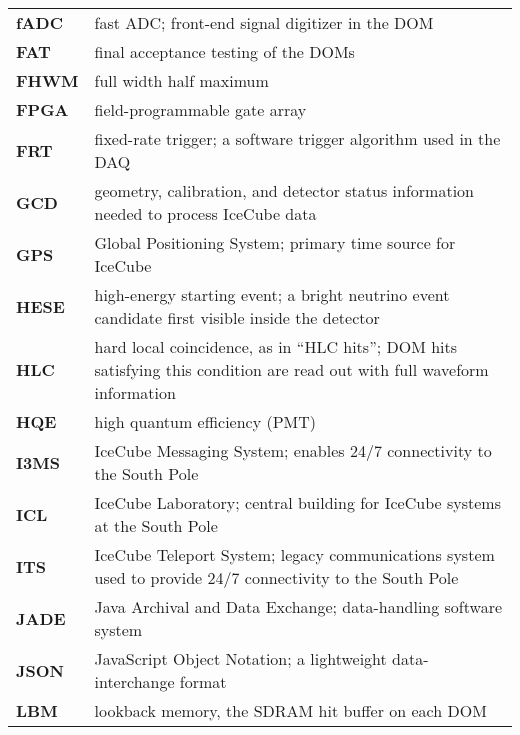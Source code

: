 \begin{longtable}{p{} p{}}
  \textbf{fADC} & fast ADC; front-end signal digitizer in the DOM \\
  
  \textbf{FAT} & final acceptance testing of the DOMs \\

  \textbf{FHWM} & full width half maximum \\

  \textbf{FPGA} & field-programmable gate array \\
  
  \textbf{FRT} & fixed-rate trigger; a software trigger algorithm used
  in the DAQ \\

  \textbf{GCD} & geometry, calibration, and detector status information
  needed to process IceCube data \\
  
  \textbf{GPS} & Global Positioning System; primary time source for IceCube
  \\

  \textbf{HESE} & high-energy starting event; a bright neutrino event
  candidate first visible inside the detector \\
  
  \textbf{HLC} & hard local coincidence, as in ``HLC hits'';
  DOM hits satisfying this condition are read out with full
  waveform information \\

  \textbf{HQE} & high quantum efficiency (PMT) \\

  \textbf{I3MS} & IceCube Messaging System; enables 24/7
  connectivity to the South Pole \\
  
  \textbf{ICL} & IceCube Laboratory; central building for IceCube systems
  at the South Pole \\

  \textbf{ITS} & IceCube Teleport System; legacy communications system used
  to provide 24/7 connectivity to the South Pole \\

  \textbf{JADE} & Java Archival and Data Exchange; data-handling software
  system \\

  \textbf{JSON} & JavaScript Object Notation; a lightweight
  data-interchange format \\

  \textbf{LBM} & lookback memory, the SDRAM hit buffer on each DOM \\
  

\end{longtable}
